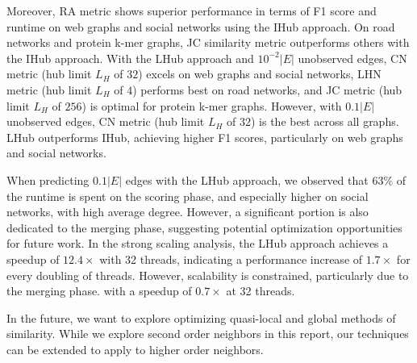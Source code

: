 Moreover, RA metric shows superior performance in terms of F1 score and runtime on web graphs and social networks using the IHub approach. On road networks and protein k-mer graphs, JC similarity metric outperforms others with the IHub approach. With the LHub approach and $10^{-2}|E|$ unobserved edges, CN metric (hub limit $L_H$ of $32$) excels on web graphs and social networks, LHN metric (hub limit $L_H$ of $4$) performs best on road networks, and JC metric (hub limit $L_H$ of $256$) is optimal for protein k-mer graphs. However, with $0.1|E|$ unobserved edges, CN metric (hub limit $L_H$ of $32$) is the best across all graphs. LHub outperforms IHub, achieving higher F1 scores, particularly on web graphs and social networks.

When predicting $0.1|E|$ edges with the LHub approach, we observed that $63\%$ of the runtime is spent on the scoring phase, and especially higher on social networks, with high average degree. However, a significant portion is also dedicated to the merging phase, suggesting potential optimization opportunities for future work. In the strong scaling analysis, the LHub approach achieves a speedup of $12.4\times$ with 32 threads, indicating a performance increase of $1.7\times$ for every doubling of threads. However, scalability is constrained, particularly due to the merging phase. with a speedup of $0.7\times$ at 32 threads.

In the future, we want to explore optimizing quasi-local and global methods of similarity. While we explore second order neighbors in this report, our techniques can be extended to apply to higher order neighbors.

